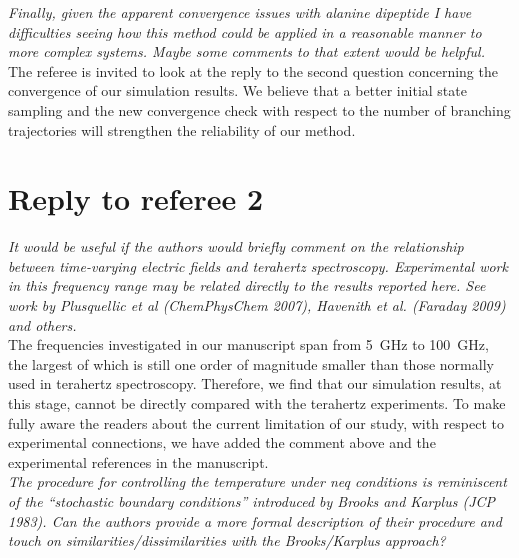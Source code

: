 \documentclass[]{revtex4-1}
\begin{document}
\emph{Finally, given the apparent convergence issues with alanine
  dipeptide I have difficulties seeing how this method could be
  applied in a reasonable manner to more complex systems. Maybe some
  comments to that extent would be helpful.  }\\


The referee is invited to look at the reply to the second question concerning the convergence
of our simulation results. We believe that a better initial
state sampling and the new convergence check with respect to the
number of branching trajectories will strengthen the reliability
of our method.






\section*{Reply to referee 2}

\emph{
It would be useful if the authors would briefly comment on the
relationship between time-varying electric fields and terahertz
spectroscopy. Experimental work in this frequency range may be related
directly to the results reported here. See work by Plusquellic et al
(ChemPhysChem 2007), Havenith et al. (Faraday 2009) and others.
}\\

The frequencies investigated in our manuscript span from 5~GHz to 100~GHz,
the largest of which is still one order of magnitude smaller than those normally used in  terahertz spectroscopy. Therefore, we find that our simulation results, at this stage, cannot be directly compared with the terahertz experiments.
{To make fully aware the readers about the current limitation of our study, with respect to experimental connections, we have added the comment above and the experimental references in the manuscript.}
\\

\emph{ The procedure for controlling the temperature under neq
  conditions is reminiscent of the ``stochastic boundary conditions''
  introduced by Brooks and Karplus (JCP 1983). Can the authors provide
  a more formal description of their procedure and touch on
  similarities/dissimilarities with the Brooks/Karplus approach?  }\\
\end{document}
